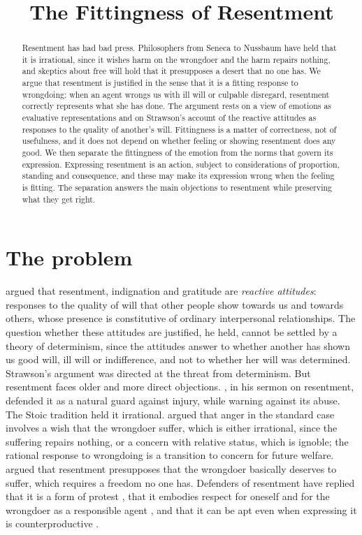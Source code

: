 \documentclass{situationist-preprint}
\title{The Fittingness of Resentment}
\begin{document}
\maketitle

\begin{abstract}
Resentment has had bad press. Philosophers from Seneca to Nussbaum have held that it is irrational, since it wishes harm on the wrongdoer and the harm repairs nothing, and skeptics about free will hold that it presupposes a desert that no one has. We argue that resentment is justified in the sense that it is a fitting response to wrongdoing: when an agent wrongs us with ill will or culpable disregard, resentment correctly represents what she has done. The argument rests on a view of emotions as evaluative representations and on Strawson's account of the reactive attitudes as responses to the quality of another's will. Fittingness is a matter of correctness, not of usefulness, and it does not depend on whether feeling or showing resentment does any good. We then separate the fittingness of the emotion from the norms that govern its expression. Expressing resentment is an action, subject to considerations of proportion, standing and consequence, and these may make its expression wrong when the feeling is fitting. The separation answers the main objections to resentment while preserving what they get right.
\end{abstract}

\section{The problem}

\citet{Strawson1962} argued that resentment, indignation and gratitude are \emph{reactive attitudes}: responses to the quality of will that other people show towards us and towards others, whose presence is constitutive of ordinary interpersonal relationships. The question whether these attitudes are justified, he held, cannot be settled by a theory of determinism, since the attitudes answer to whether another has shown us good will, ill will or indifference, and not to whether her will was determined. Strawson's argument was directed at the threat from determinism. But resentment faces older and more direct objections. \citet{Butler1726}, in his sermon on resentment, defended it as a natural guard against injury, while warning against its abuse. The Stoic tradition held it irrational. \citet{Nussbaum2016} argued that anger in the standard case involves a wish that the wrongdoer suffer, which is either irrational, since the suffering repairs nothing, or a concern with relative status, which is ignoble; the rational response to wrongdoing is a transition to concern for future welfare. \citet{Pereboom2001} argued that resentment presupposes that the wrongdoer basically deserves to suffer, which requires a freedom no one has. Defenders of resentment have replied that it is a form of protest \citep{Hieronymi2001}, that it embodies respect for oneself and for the wrongdoer as a responsible agent \citep{MurphyHampton1988}, and that it can be apt even when expressing it is counterproductive \citep{Srinivasan2018}.
\end{document}
